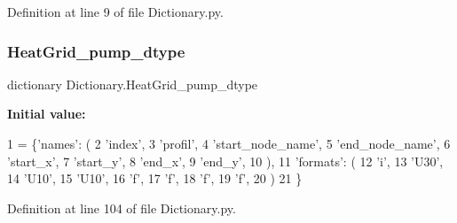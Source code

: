 Definition at line 9 of file Dictionary.\+py.

\mbox{\label{namespace_dictionary_a616d65efc5bb5f169c0fb9781b4292c2}} 
\subsubsection{\texorpdfstring{Heat\+Grid\+\_\+pump\+\_\+dtype}{HeatGrid\_pump\_dtype}}
{\footnotesize\ttfamily dictionary Dictionary.\+Heat\+Grid\+\_\+pump\+\_\+dtype}

{\bfseries Initial value\+:}
\begin{DoxyCode}
1 =     \{\textcolor{stringliteral}{'names'}: (
2                                 \textcolor{stringliteral}{'index'},
3                                 \textcolor{stringliteral}{'profil'},
4                                 \textcolor{stringliteral}{'start\_node\_name'},
5                                 \textcolor{stringliteral}{'end\_node\_name'},
6                                 \textcolor{stringliteral}{'start\_x'},
7                                 \textcolor{stringliteral}{'start\_y'},
8                                 \textcolor{stringliteral}{'end\_x'},
9                                 \textcolor{stringliteral}{'end\_y'},
10                                 ),
11                        \textcolor{stringliteral}{'formats'}: (
12                                 \textcolor{stringliteral}{'i'},
13                                 \textcolor{stringliteral}{'U30'},
14                                 \textcolor{stringliteral}{'U10'},
15                                 \textcolor{stringliteral}{'U10'},
16                                 \textcolor{stringliteral}{'f'},
17                                 \textcolor{stringliteral}{'f'},
18                                 \textcolor{stringliteral}{'f'},
19                                 \textcolor{stringliteral}{'f'},
20                                 )
21                                \}
\end{DoxyCode}


Definition at line 104 of file Dictionary.\+py.

\mbox{\label{namespace_dictionary_a98301ff2458867192a5d80b8d59dfe94}} 
